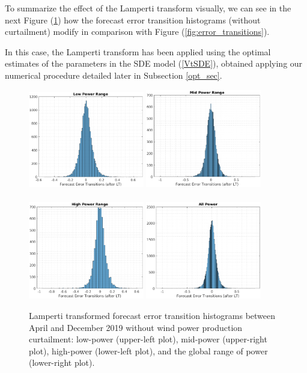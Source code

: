 \documentclass[11pt]{article}
\theoremstyle{definition}
\begin{document}
To summarize the effect of the Lamperti transform visually, we can see in the next Figure (\ref{fig:LP_transitions}) how the forecast error transition histograms (without curtailment) modify in comparison with Figure (\ref{fig:error_transitions}).

In this case, the Lamperti transform has been applied using the optimal estimates of the parameters in the SDE model (\ref{VtSDE}), obtained applying our numerical procedure detailed later in Subsection \ref{opt_sec}.  

\begin{figure}[H]
\centering
\includegraphics[width=0.45\textwidth]{plots/LP_t_LP.eps}
\includegraphics[width=0.45\textwidth]{plots/MP_t_LP.eps}\\
\quad\\
\includegraphics[width=0.45\textwidth]{plots/HP_t_LP.eps}
\includegraphics[width=0.45\textwidth]{plots/AP_t_LP.eps}
\caption{Lamperti transformed forecast error transition histograms between April and December 2019 without wind power production curtailment: low-power (upper-left plot), mid-power (upper-right plot), high-power (lower-left plot), and the global range of power (lower-right plot).}
  \label{fig:LP_transitions}
\end{figure}
\end{document}
